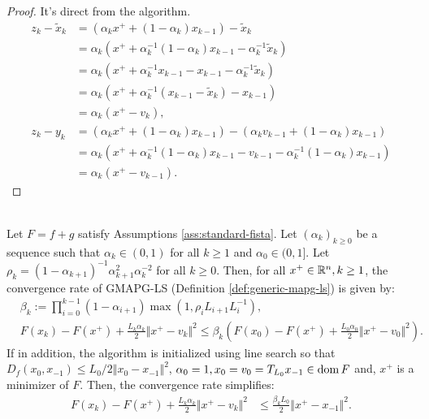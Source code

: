 \documentclass[12pt]{report}
\begin{document}
        \begin{proof}
            It's direct from the algorithm. 
            \begin{align*}
                z_k - \tilde x_k &= (\alpha_k x^+ + (1 - \alpha_k)x_{k - 1}) - \tilde x_k
                \\
                &= \alpha_k (x^+ + \alpha_k^{-1}(1 - \alpha_k)x_{k - 1} - \alpha_k^{-1}\tilde x_k)
                \\
                &= \alpha_k(x^+ + \alpha_k^{-1}x_{k - 1} - x_{k - 1} - \alpha_k^{-1}\tilde x_k)
                \\
                &= \alpha_k(x^+ + \alpha_k^{-1}(x_{k - 1} - \tilde x_k) - x_{k - 1})
                \\
                &= \alpha_k(x^+ - v_{k}), 
                \\
                z_k - y_k &= 
                (\alpha_k x^+ + (1 - \alpha_k)x_{k - 1}) - \left(
                    \alpha_k v_{k - 1} + (1 - \alpha_k)x_{k - 1}
                \right)
                \\
                &= \alpha_k(x^+ + \alpha_k^{-1}(1 - \alpha_k)x_{k - 1} - v_{k - 1} - \alpha_k^{-1}(1 - \alpha_k)x_{k - 1})
                \\
                &= \alpha_k(x^+ - v_{k - 1}). 
            \end{align*}
        \end{proof}
        \begin{theorem}\; \label{thm:gmapg-ls-convergence}\;\\
            Let $F = f + g$ satisfy Assumptions \ref{ass:standard-fista}. 
            Let $(\alpha_k)_{k \ge 0}$ be a sequence such that $\alpha_k \in (0, 1)$ for all $k \ge 1$ and $\alpha_0 \in (0, 1]$. 
            Let $\rho_k = (1 - \alpha_{k + 1})^{-1}\alpha_{k + 1}^2 \alpha_k^{-2}$ for all $k \ge 0$. 
            Then, for all $x^+ \in \mathbb R^n, k \ge 1$, the convergence rate of GMAPG-LS (Definition \ref{def:generic-mapg-ls}) is given by: 
            \begin{align*}
                & \beta_k := \prod_{i = 0}^{k - 1} (1 - \alpha_{i + 1})
                \max\left(1, \rho_i L_{i + 1}L_i^{-1}\right), 
                \\
                & F(x_k) - F(x^+) + \frac{L_k\alpha_k}{2}\Vert x^+ - v_k\Vert^2
                \le 
                \beta_k
                \left(
                    F(x_0) - F(x^+) + \frac{L_0\alpha_0}{2} \Vert x^+ - v_0\Vert^2
                \right). 
            \end{align*}
            If in addition, the algorithm is initialized using line search so that \mbox{$D_f(x_0, x_{-1}) \le L_0/2 \Vert x_0 - x_{-1}\Vert^2$}, $\alpha_0 = 1, x_0 = v_0 = T_{L_{0}}x_{-1} \in \operatorname{dom} F$ and, $x^+$ is a minimizer of $F$.
            Then, the convergence rate simplifies: 
            \begin{align*}
                F(x_k) - F(x^+) + \frac{L_k\alpha_k}{2}\Vert x^+ - v_k\Vert^2
                & \le 
                \frac{\beta_kL_0}{2}\Vert x^+ - x_{-1}\Vert^2. 
            \end{align*}
        \end{theorem}
\end{document}
